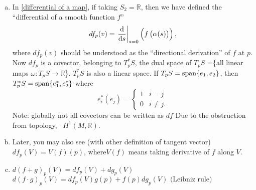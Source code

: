\begin{remark}
    \hfill
    \begin{enumerate}[(a)]
        \item In \cref{differential of a map}, if taking \(S_2=\mathbb{R}\),
        then we have defined the ``differential of a smooth function \(f\)''
        \[
            df_p(v)=\left.\dv{s}\right|_{s=0}
            \left(f\left(\alpha(s)\right)\right)    
        ,\]
        where \(df_p(v)\) should be understood as the ``directional
         derivation'' of \(f\) at \(p\). Now \(df_p\) is
         a covector, belonging to \(T_p^*S\), the dual space of 
         \(T_p S\) =\{all linear maps \(\omega\colon T_p S\to 
         \mathbb{R}\)\}. \(T_p^* S\) is also a linear space.
         If \(T_p S=\operatorname{span}\{e_1,e_2\}\), then \(T_p^*S=
         \operatorname{span}\{e^*_1,e^*_2\}\) where 
         \[ e^*_i\left(e_j\right)=
         \begin{cases}
            1& i=j      \\
            0 & i\neq j.
         \end{cases}
         \]
         Note: globally not all covectors can be written as \(df\)
         Due to the obstruction from topology, \ie\ \(H^1(M,\mathbb{R})\).
         \item Later, you may also see (with other definition of tangent
         vector) \(df_p(V)=V(f)(p)\), where\(V(f)\) means taking 
         derivative of \(f\) along \(V\).
         \item
            \( d(f+g)_p(V)=df_p(V)+dg_p(V) \)\\
            \(d(f\cdot g)_p(V)=df_p(V)g(p)+f(p)dg_p(V)
            \text{ (Leibniz rule)} \)  
        \end{enumerate}
\end{remark}
